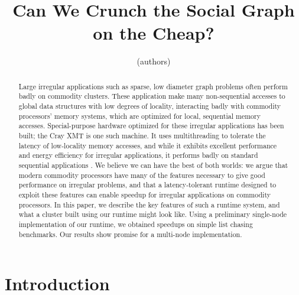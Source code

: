 \documentclass{acm_proc_article-sp}
\begin{document}
\title{Can We Crunch the Social Graph on the Cheap?}

\author{
(authors)
}

\maketitle
\begin{abstract}

  Large irregular applications such as sparse, low diameter graph problems often
  perform badly on commodity clusters. These application make many
  non-sequential accesses to global data structures with low degrees of
  locality, interacting badly with commodity processors' memory
  systems, which are optimized for local, sequential memory
  accesses. Special-purpose hardware optimized for these irregular
  applications has been built; the Cray XMT is one such machine. It
  uses multithreading to tolerate the latency of low-locality memory
  accesses, and while it exhibits excellent performance and energy
  efficiency for irregular applications, it performs badly on standard
  sequential applications . We believe we can have the best of both
  worlds: we argue that modern commodity processors have many of the
  features necessary  to give good performance on irregular problems,
  and that a latency-tolerant runtime designed to exploit these
  features can enable speedup for irregular applications on commodity
  processors. In this paper, we describe the key features of such a
  runtime system, and what a cluster built using our runtime might
  look like. Using a preliminary single-node implementation of our
  runtime, we obtained speedups on simple list chasing benchmarks. Our results show promise for a multi-node implementation.

\end{abstract}

\section{Introduction}
\end{document}
